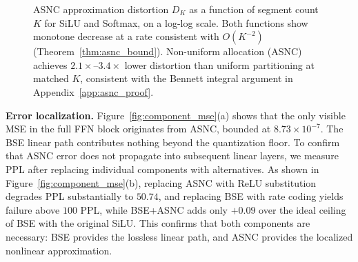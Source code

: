 \documentclass{article}
\theoremstyle{plain}
\theoremstyle{definition}
\theoremstyle{remark}
\begin{document}
\begin{figure}[h!]
\centering
{}
\caption{ASNC approximation distortion $D_K$ as a function of segment count $K$
for SiLU and Softmax, on a log-log scale. Both functions show monotone decrease at a
rate consistent with $O(K^{-2})$ (Theorem~\ref{thm:asnc_bound}). Non-uniform
allocation (ASNC) achieves $2.1\times$--$3.4\times$ lower distortion than uniform
partitioning at matched $K$, consistent with the Bennett integral argument in
Appendix~\ref{app:asnc_proof}.}
\label{fig:asnc_distortion}
\end{figure}

\noindent\textbf{Error localization.}
Figure~\ref{fig:component_mse}(a) shows that the only visible MSE in the full FFN
block originates from ASNC, bounded at $8.73 \times 10^{-7}$. The BSE linear path
contributes nothing beyond the quantization floor. To confirm that ASNC error does
not propagate into subsequent linear layers, we measure PPL after replacing individual
components with alternatives. As shown in Figure~\ref{fig:component_mse}(b), replacing
ASNC with ReLU substitution degrades PPL substantially to $50.74$, and replacing BSE
with rate coding yields failure above $100$ PPL, while BSE+ASNC adds only $+0.09$
over the ideal ceiling of BSE with the original SiLU. This confirms that both
components are necessary: BSE provides the lossless linear path, and ASNC provides
the localized nonlinear approximation.
\end{document}
